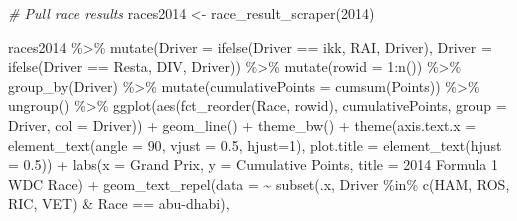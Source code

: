 \documentclass[
]{book}
\newenvironment{Shaded}{\begin{snugshade}}{\end{snugshade}}
\newcommand{\AttributeTok}[1]{\textcolor[rgb]{0.77,0.63,0.00}{#1}}
\newcommand{\CommentTok}[1]{\textcolor[rgb]{0.56,0.35,0.01}{\textit{#1}}}
\newcommand{\DecValTok}[1]{\textcolor[rgb]{0.00,0.00,0.81}{#1}}
\newcommand{\FloatTok}[1]{\textcolor[rgb]{0.00,0.00,0.81}{#1}}
\newcommand{\FunctionTok}[1]{\textcolor[rgb]{0.00,0.00,0.00}{#1}}
\newcommand{\NormalTok}[1]{#1}
\newcommand{\OtherTok}[1]{\textcolor[rgb]{0.56,0.35,0.01}{#1}}
\newcommand{\SpecialCharTok}[1]{\textcolor[rgb]{0.00,0.00,0.00}{#1}}
\newcommand{\StringTok}[1]{\textcolor[rgb]{0.31,0.60,0.02}{#1}}
\begin{document}
\begin{Shaded}
\begin{Highlighting}[]
\CommentTok{\# Pull race results}
\NormalTok{races2014 }\OtherTok{\textless{}{-}} \FunctionTok{race\_result\_scraper}\NormalTok{(}\DecValTok{2014}\NormalTok{)}

\NormalTok{races2014 }\SpecialCharTok{\%\textgreater{}\%}
  \FunctionTok{mutate}\NormalTok{(}\AttributeTok{Driver =} \FunctionTok{ifelse}\NormalTok{(Driver }\SpecialCharTok{==} \StringTok{\textquotesingle{}ikk\textquotesingle{}}\NormalTok{, }\StringTok{\textquotesingle{}RAI\textquotesingle{}}\NormalTok{, Driver),}
         \AttributeTok{Driver =} \FunctionTok{ifelse}\NormalTok{(Driver }\SpecialCharTok{==} \StringTok{\textquotesingle{}Resta\textquotesingle{}}\NormalTok{, }\StringTok{\textquotesingle{}DIV\textquotesingle{}}\NormalTok{, Driver)) }\SpecialCharTok{\%\textgreater{}\%} 
  \FunctionTok{mutate}\NormalTok{(}\AttributeTok{rowid =} \DecValTok{1}\SpecialCharTok{:}\FunctionTok{n}\NormalTok{()) }\SpecialCharTok{\%\textgreater{}\%}
  \FunctionTok{group\_by}\NormalTok{(Driver) }\SpecialCharTok{\%\textgreater{}\%} 
  \FunctionTok{mutate}\NormalTok{(}\AttributeTok{cumulativePoints =} \FunctionTok{cumsum}\NormalTok{(Points)) }\SpecialCharTok{\%\textgreater{}\%}
  \FunctionTok{ungroup}\NormalTok{() }\SpecialCharTok{\%\textgreater{}\%} 
  \FunctionTok{ggplot}\NormalTok{(}\FunctionTok{aes}\NormalTok{(}\FunctionTok{fct\_reorder}\NormalTok{(Race, rowid), cumulativePoints,}
         \AttributeTok{group =}\NormalTok{ Driver, }\AttributeTok{col =}\NormalTok{ Driver)) }\SpecialCharTok{+}
  \FunctionTok{geom\_line}\NormalTok{() }\SpecialCharTok{+}
  \FunctionTok{theme\_bw}\NormalTok{() }\SpecialCharTok{+} 
  \FunctionTok{theme}\NormalTok{(}\AttributeTok{axis.text.x =} \FunctionTok{element\_text}\NormalTok{(}\AttributeTok{angle =} \DecValTok{90}\NormalTok{, }\AttributeTok{vjust =} \FloatTok{0.5}\NormalTok{, }\AttributeTok{hjust=}\DecValTok{1}\NormalTok{),}
        \AttributeTok{plot.title =} \FunctionTok{element\_text}\NormalTok{(}\AttributeTok{hjust =} \FloatTok{0.5}\NormalTok{)) }\SpecialCharTok{+}
  \FunctionTok{labs}\NormalTok{(}\AttributeTok{x =} \StringTok{\textquotesingle{}Grand Prix\textquotesingle{}}\NormalTok{,}
       \AttributeTok{y =} \StringTok{\textquotesingle{}Cumulative Points\textquotesingle{}}\NormalTok{,}
       \AttributeTok{title =} \StringTok{\textquotesingle{}2014 Formula 1 WDC Race\textquotesingle{}}\NormalTok{) }\SpecialCharTok{+} \FunctionTok{geom\_text\_repel}\NormalTok{(}\AttributeTok{data =} \SpecialCharTok{\textasciitilde{}} \FunctionTok{subset}\NormalTok{(.x, Driver }\SpecialCharTok{\%in\%} \FunctionTok{c}\NormalTok{(}\StringTok{\textquotesingle{}HAM\textquotesingle{}}\NormalTok{, }\StringTok{\textquotesingle{}ROS\textquotesingle{}}\NormalTok{, }\StringTok{\textquotesingle{}RIC\textquotesingle{}}\NormalTok{, }\StringTok{\textquotesingle{}VET\textquotesingle{}}\NormalTok{) }\SpecialCharTok{\&}\NormalTok{ Race }\SpecialCharTok{==} \StringTok{\textquotesingle{}abu{-}dhabi\textquotesingle{}}\NormalTok{),}

\end{Highlighting}
\end{Shaded}
\end{document}
